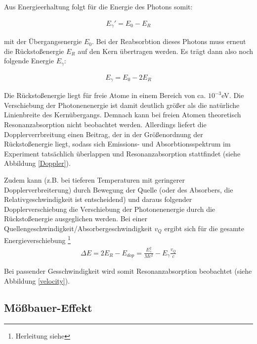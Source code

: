 {Aus Energieerhaltung folgt für die Energie des Photons somit:

\begin{align}
E_{\gamma}' = E_0 - E_R
\end{align}

mit der Übergangsenergie $E_0$. Bei der Reabsorbtion dieses Photons muss erneut die Rückstoßenergie $E_R$  auf den Kern übertragen werden. Es trägt dann also noch folgende Energie $E_{\gamma}$:

\begin{align}
E_{\gamma} = E_0-2E_R
\end{align}

Die Rückstoßenergie liegt für freie Atome in einem Bereich von ca.  $10^{-3}$eV. Die Verschiebung der Photonenenergie ist damit deutlich größer als die natürliche Linienbreite des Kernübergangs. Demnach kann bei freien Atomen theoretisch Resonanzabsorption nicht beobachtet werden. Allerdings liefert die Dopplerverrbreitung einen Beitrag, der in der Größenordnung der Rückstoßenergie liegt, sodass sich Emissions- und Absorbtionsspektrum im Experiment tatsächlich überlappen und Resonanzabsorption stattfindet (siehe Abbildung \ref{Doppler}).


Zudem kann (z.B. bei tieferen Temperaturen mit geringerer Dopplerverbreiterung) durch Bewegung der Quelle (oder des Absorbers, die Relativgeschwindigkeit ist entscheidend) und daraus folgender Dopplerverschiebung die Verschiebung der Photonenenergie durch die Rückstoßenergie ausgeglichen werden.
Bei einer Quellengeschwindigkeit/Absorbergeschwindigkeit $v_Q$ ergibt sich für die gesamte Energieverschiebung \footnote{Herleitung siehe} %
\begin{align}
\Delta E = 2E_R - E_{dop} = \frac{E_{\gamma}^2}{Mc^2} - E_{\gamma}\frac{v_Q}{c}
\end{align}

Bei passender Gesschwindigkeit wird somit Resonanzabsorption beobachtet (siehe Abbildung \ref{velocity}).\cite{jakobs}


\subsection{ Mößbauer-Effekt}

}
